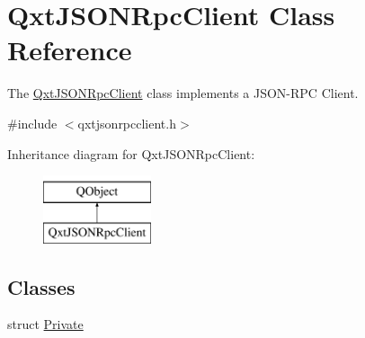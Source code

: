 \hypertarget{class_qxt_j_s_o_n_rpc_client}{\section{Qxt\-J\-S\-O\-N\-Rpc\-Client Class Reference}
\label{class_qxt_j_s_o_n_rpc_client}
}


The \hyperlink{class_qxt_j_s_o_n_rpc_client}{Qxt\-J\-S\-O\-N\-Rpc\-Client} class implements a J\-S\-O\-N-\/\-R\-P\-C Client.  




{\ttfamily \#include $<$qxtjsonrpcclient.\-h$>$}

Inheritance diagram for Qxt\-J\-S\-O\-N\-Rpc\-Client\-:\begin{figure}[H]
\begin{center}
\leavevmode
\includegraphics[height=2.000000cm]{class_qxt_j_s_o_n_rpc_client}
\end{center}
\end{figure}
\subsection*{Classes}
\begin{DoxyCompactItemize}
\item 
struct \hyperlink{struct_qxt_j_s_o_n_rpc_client_1_1_private}{Private}
\end{DoxyCompactItemize}
